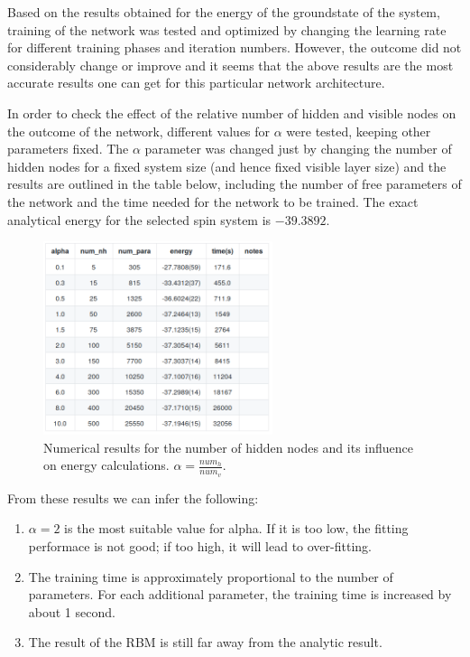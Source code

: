 \documentclass{article}
\begin{document}
Based on the results obtained for the energy of the groundstate of the system, training of the network was tested and optimized by changing the learning rate for different training phases and iteration numbers. However, the outcome did not considerably change or improve and it seems that the above results are the most accurate results one can get for this particular network architecture. 

In order to check the effect of the relative number of hidden and visible nodes on the outcome of the network, different values for $\alpha$ were tested, keeping other parameters fixed. The $\alpha$ parameter was changed just by changing the number of hidden nodes for a fixed system size (and hence fixed visible layer size) and the results are outlined in the table below, including the number of free parameters of the network and the time needed for the network to be trained. The exact analytical energy for the selected spin system is $-39.3892$.

\begin{figure}[!htb]
	\centering
	\includegraphics[width=0.6\textwidth]{./images/alpha.png}
	\caption{\label{tab:alpha} Numerical results for the number of hidden nodes and its influence on energy calculations. $\alpha = \frac{num_{h}}{num_{v}}$.} 
\end{figure}

From these results we can infer the following:

\begin{enumerate}
	\item $\alpha = 2$ is the most suitable value for alpha. If it is too low, the fitting performace is not good; if too high, it will lead to over-fitting. 
	\item The training time is approximately proportional to the number of parameters. For each additional parameter, the training time is increased by about 1 second.
	\item The result of the RBM is still far away from the analytic result.
\end{enumerate}
\end{document}
